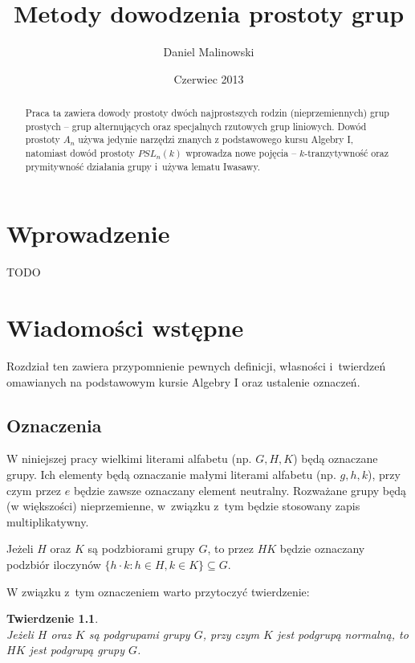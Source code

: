 \documentclass[licencjacka]{pracamgr}
\author{Daniel Malinowski}
\title{Metody dowodzenia prostoty grup}
\date{Czerwiec 2013}
\newtheorem{thh}{Twierdzenie}[section]
\begin{document}
\maketitle

\begin{abstract}
  Praca ta zawiera dowody prostoty dwóch najprostszych rodzin (nieprzemiennych) grup prostych --
  grup alternujących oraz specjalnych rzutowych grup liniowych.
  Dowód prostoty $A_n$ używa jedynie narzędzi znanych z podstawowego kursu Algebry I,
  natomiast dowód prostoty $PSL_n(k)$ wprowadza nowe pojęcia -- $k$-tranzytywność
  oraz prymitywność działania grupy i~używa lematu Iwasawy.
\end{abstract}

\tableofcontents


\chapter*{Wprowadzenie}



TODO

\chapter{Wiadomości wstępne}

Rozdział ten zawiera przypomnienie pewnych definicji, własności
i~twierdzeń omawianych na podstawowym kursie
Algebry I oraz ustalenie oznaczeń.

\section{Oznaczenia}

W niniejszej pracy wielkimi literami alfabetu (np.
$G, H, K$) będą oznaczane grupy. Ich elementy będą oznaczanie małymi
literami alfabetu (np. $g, h, k$), przy czym przez $e$ będzie zawsze
oznaczany element neutralny. Rozważane grupy będą (w większości)
nieprzemienne, w~związku z~tym będzie stosowany zapis
multiplikatywny.

Jeżeli $H$ oraz $K$ są podzbiorami grupy $G$, to przez $HK$
będzie oznaczany podzbiór iloczynów $\{ h\cdot k \colon h \in H, k \in K\}\subseteq G$.

W związku z~tym oznaczeniem warto przytoczyć twierdzenie:

\begin{thh} \label{mult_groups} $ $ \\
    Jeżeli $H$ oraz $K$ są podgrupami grupy $G$, przy czym $K$ jest podgrupą normalną,
    to $HK$ jest podgrupą grupy $G$.
\end{thh}
\end{document}
